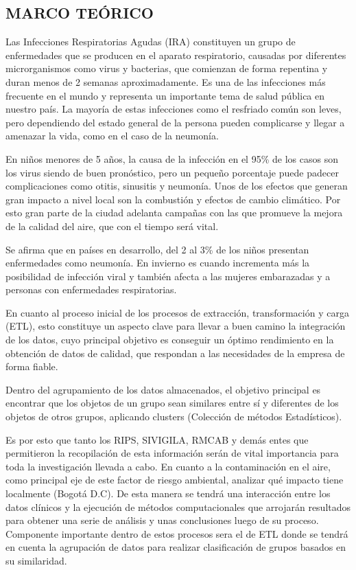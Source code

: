 \documentclass[a4paper, 12pt, oneside]{article}
\theoremstyle{definition}
\theoremstyle{remark}
\begin{document}
\subsection{MARCO TEÓRICO}


Las Infecciones Respiratorias Agudas (IRA) constituyen un grupo de enfermedades que se producen en el aparato respiratorio, causadas por diferentes microrganismos como virus y bacterias, que comienzan de forma repentina y duran menos de 2 semanas aproximadamente. Es una de las infecciones más frecuente en el mundo y representa un importante tema de salud pública en nuestro país.  La mayoría de estas infecciones como el resfriado común son leves, pero dependiendo del estado general de la persona pueden complicarse y llegar a amenazar la vida, como en el caso de la neumonía.

En niños menores de 5 años, la causa de la infección en el  95\% de los casos son los virus siendo de buen pronóstico, pero un pequeño porcentaje puede padecer complicaciones como  otitis, sinusitis y neumonía. Unos de los efectos que generan gran impacto a nivel local son  la combustión y efectos de cambio climático. Por esto  gran parte de la ciudad adelanta campañas con las que promueve la mejora de la calidad del aire, que con el tiempo será vital.

Se afirma que en países en desarrollo, del 2 al 3\% de los niños presentan enfermedades como neumonía. En invierno es cuando incrementa más la posibilidad de infección viral y también afecta a las mujeres embarazadas y a personas con enfermedades respiratorias.

En cuanto al proceso inicial de los procesos de extracción, transformación y carga (ETL), esto constituye un aspecto clave para llevar a buen camino la integración de los datos, cuyo principal objetivo es conseguir un óptimo rendimiento en la obtención de datos de calidad, que respondan a las necesidades de la empresa de forma fiable.

Dentro del agrupamiento de los datos almacenados, el objetivo principal es encontrar que los objetos de un grupo sean similares entre sí y diferentes de los objetos de otros grupos, aplicando clusters (Colección de métodos Estadísticos).

Es por esto que tanto los  RIPS, SIVIGILA, RMCAB y demás entes que permitieron la recopilación de esta información serán de vital importancia para toda la investigación llevada a cabo. En cuanto a la contaminación en el aire, como principal eje de este factor de riesgo ambiental, analizar qué impacto tiene localmente (Bogotá D.C). De esta manera se tendrá una interacción entre los datos clínicos y la ejecución de métodos computacionales que arrojarán resultados para obtener una serie de análisis y unas conclusiones luego de su proceso. Componente importante dentro de estos procesos sera el de ETL donde se tendrá en cuenta la agrupación de datos para realizar clasificación de grupos basados en su similaridad. 
\end{document}

